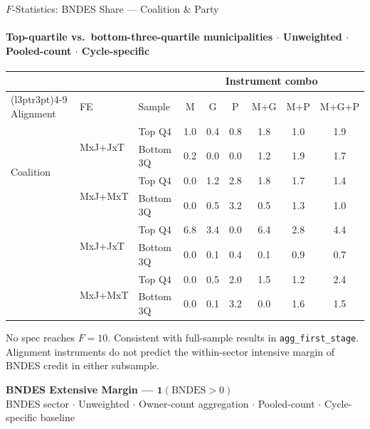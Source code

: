 \documentclass[aspectratio=169,10pt]{beamer}
\begin{document}
\begin{frame}[t]{$F$-Statistics: BNDES Share --- Coalition \& Party}
\framesubtitle{Top-quartile vs.\ bottom-three-quartile municipalities $\cdot$ Unweighted $\cdot$ Pooled-count $\cdot$ Cycle-specific}
\begin{center}
\footnotesize
\setlength{\tabcolsep}{4pt}
\renewcommand{\arraystretch}{1.05}
\begin{tabular}{@{}lllcccccc@{}}
\toprule
 & & & \multicolumn{6}{c}{Instrument combo} \\
\cmidrule(l{3pt}r{3pt}){4-9}
Alignment & FE & Sample & M & G & P & M+G & M+P & M+G+P \\
\midrule
\multirow{4}{*}{Coalition}
 & \multirow{2}{*}{MxJ+JxT} & Top Q4    & 1.0 & 0.4 & 0.8 & 1.8 & 1.0 & 1.9 \\
 &                           & Bottom 3Q & 0.2 & 0.0 & 0.0 & 1.2 & 1.9 & 1.7 \\
 & \multirow{2}{*}{MxJ+MxT} & Top Q4    & 0.0 & 1.2 & 2.8 & 1.8 & 1.7 & 1.4 \\
 &                           & Bottom 3Q & 0.0 & 0.5 & 3.2 & 0.5 & 1.3 & 1.0 \\
\addlinespace[4pt]
\multirow{4}{*}{Party}
 & \multirow{2}{*}{MxJ+JxT} & Top Q4    & 6.8 & 3.4 & 0.0 & 6.4 & 2.8 & 4.4 \\
 &                           & Bottom 3Q & 0.0 & 0.1 & 0.4 & 0.1 & 0.9 & 0.7 \\
 & \multirow{2}{*}{MxJ+MxT} & Top Q4    & 0.0 & 0.5 & 2.0 & 1.5 & 1.2 & 2.4 \\
 &                           & Bottom 3Q & 0.0 & 0.1 & 3.2 & 0.0 & 1.6 & 1.5 \\
\bottomrule
\end{tabular}
\end{center}
{\scriptsize No spec reaches $F=10$. Consistent with full-sample results in \texttt{agg\_first\_stage}.
Alignment instruments do not predict the within-sector intensive margin of BNDES credit in either subsample.}
\end{frame}


\begin{frame}[plain]
\begin{center}
{\Large\textbf{BNDES Extensive Margin --- $\mathbf{1}(\text{BNDES}>0)$}}\\[0.5em]
\small BNDES sector $\cdot$ Unweighted $\cdot$ Owner-count aggregation $\cdot$ Pooled-count $\cdot$ Cycle-specific baseline
\end{center}
\end{frame}
\end{document}
